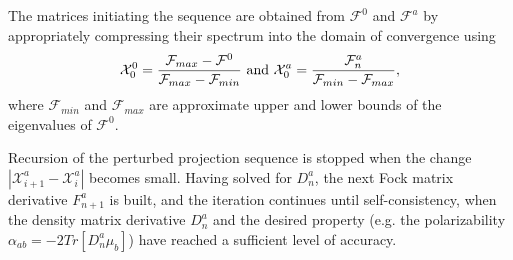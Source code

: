 \documentclass[prl,aps,preprint,showpacs,superbib]{revtex4}
\begin{document}
The matrices initiating the sequence are obtained from $\mathcal{F}^0$
and  $\mathcal{F}^a$ by appropriately 
compressing their spectrum into the domain of convergence \cite{ANiklasson02A} using
\begin{equation}
\mathcal{X}^0_{0}=\frac{\mathcal{F}_{max}-\mathcal{F}^0}{\mathcal{F}_{max}-\mathcal{F}_{min}}~{\rm and}~
\mathcal{X}^a_{0}=\frac{\mathcal{F}^a_{n}}{\mathcal{F}_{min}-\mathcal{F}_{max}},
\end{equation}
where $\mathcal{F}_{min}$ and $\mathcal{F}_{max}$ are approximate upper and lower bounds of the eigenvalues of $\mathcal{F}^0$.

Recursion of the perturbed projection sequence is stopped when the change 
$\left| \mathcal{X}^a_{i+1}-\mathcal{X}^a_i \right|$ becomes small. Having solved for $D^a_n$, 
the next Fock matrix derivative $F^a_{n+1}$ is built, and the iteration continues until 
self-consistency, when the density matrix derivative $D^a_n$ and the desired property 
(e.g. the polarizability $\alpha_{ab}=-2Tr[D^a_n\mu_b]$) have reached a sufficient level of accuracy.

\end{document}
